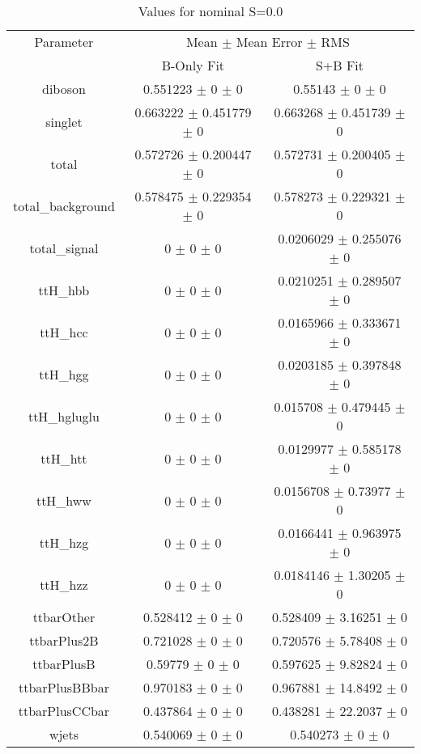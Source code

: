 \begin{table}
\centering
\caption{Values for nominal S=0.0}
\begin{tabular}{ccc}
\toprule
Parameter & \multicolumn{2}{c}{Mean $\pm$ Mean Error $\pm$ RMS}\\
 & B-Only Fit & S+B Fit\\
\midrule
diboson & \num{0.551223} $\pm$ \num{0} $\pm$ \num{0} & \num{0.55143} $\pm$ \num{0} $\pm$ \num{0}\\
singlet & \num{0.663222} $\pm$ \num{0.451779} $\pm$ \num{0} & \num{0.663268} $\pm$ \num{0.451739} $\pm$ \num{0}\\
total & \num{0.572726} $\pm$ \num{0.200447} $\pm$ \num{0} & \num{0.572731} $\pm$ \num{0.200405} $\pm$ \num{0}\\
total\_background & \num{0.578475} $\pm$ \num{0.229354} $\pm$ \num{0} & \num{0.578273} $\pm$ \num{0.229321} $\pm$ \num{0}\\
total\_signal & \num{0} $\pm$ \num{0} $\pm$ \num{0} & \num{0.0206029} $\pm$ \num{0.255076} $\pm$ \num{0}\\
ttH\_hbb & \num{0} $\pm$ \num{0} $\pm$ \num{0} & \num{0.0210251} $\pm$ \num{0.289507} $\pm$ \num{0}\\
ttH\_hcc & \num{0} $\pm$ \num{0} $\pm$ \num{0} & \num{0.0165966} $\pm$ \num{0.333671} $\pm$ \num{0}\\
ttH\_hgg & \num{0} $\pm$ \num{0} $\pm$ \num{0} & \num{0.0203185} $\pm$ \num{0.397848} $\pm$ \num{0}\\
ttH\_hgluglu & \num{0} $\pm$ \num{0} $\pm$ \num{0} & \num{0.015708} $\pm$ \num{0.479445} $\pm$ \num{0}\\
ttH\_htt & \num{0} $\pm$ \num{0} $\pm$ \num{0} & \num{0.0129977} $\pm$ \num{0.585178} $\pm$ \num{0}\\
ttH\_hww & \num{0} $\pm$ \num{0} $\pm$ \num{0} & \num{0.0156708} $\pm$ \num{0.73977} $\pm$ \num{0}\\
ttH\_hzg & \num{0} $\pm$ \num{0} $\pm$ \num{0} & \num{0.0166441} $\pm$ \num{0.963975} $\pm$ \num{0}\\
ttH\_hzz & \num{0} $\pm$ \num{0} $\pm$ \num{0} & \num{0.0184146} $\pm$ \num{1.30205} $\pm$ \num{0}\\
ttbarOther & \num{0.528412} $\pm$ \num{0} $\pm$ \num{0} & \num{0.528409} $\pm$ \num{3.16251} $\pm$ \num{0}\\
ttbarPlus2B & \num{0.721028} $\pm$ \num{0} $\pm$ \num{0} & \num{0.720576} $\pm$ \num{5.78408} $\pm$ \num{0}\\
ttbarPlusB & \num{0.59779} $\pm$ \num{0} $\pm$ \num{0} & \num{0.597625} $\pm$ \num{9.82824} $\pm$ \num{0}\\
ttbarPlusBBbar & \num{0.970183} $\pm$ \num{0} $\pm$ \num{0} & \num{0.967881} $\pm$ \num{14.8492} $\pm$ \num{0}\\
ttbarPlusCCbar & \num{0.437864} $\pm$ \num{0} $\pm$ \num{0} & \num{0.438281} $\pm$ \num{22.2037} $\pm$ \num{0}\\
wjets & \num{0.540069} $\pm$ \num{0} $\pm$ \num{0} & \num{0.540273} $\pm$ \num{0} $\pm$ \num{0}\\
\bottomrule
\end{tabular}
\end{table}